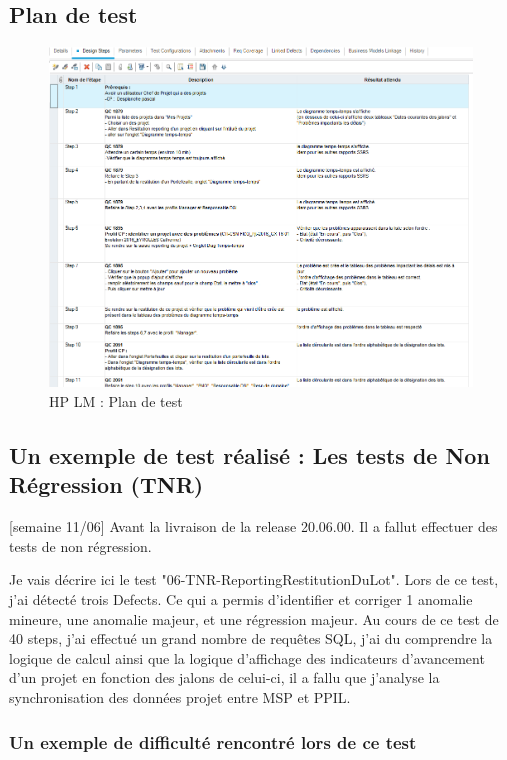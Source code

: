 \subsection{Plan de test}
\begin{figure}[!h]
\centering
\includegraphics[width=1\textwidth]{images/HPLMplantest.png}
\caption{HP LM : Plan de test}
\end{figure}

\subsection{Un exemple de test réalisé : Les tests de Non Régression (TNR)}

[semaine 11/06]
Avant la livraison de la release 20.06.00. Il a fallut effectuer des tests de non régression.

Je vais décrire ici le test "06-TNR-ReportingRestitutionDuLot". Lors de ce test, j'ai détecté trois Defects. Ce qui a permis d'identifier et corriger 1 anomalie mineure, une anomalie majeur, et une régression majeur. Au cours de ce test de 40 steps, j'ai effectué un grand nombre de requêtes SQL, j'ai du comprendre la logique de calcul ainsi que la logique d'affichage des indicateurs d'avancement d'un projet en fonction des jalons de celui-ci, il a fallu que j'analyse la synchronisation des données projet entre MSP et PPIL.
\subsubsection{Un exemple de difficulté rencontré lors de ce test}

